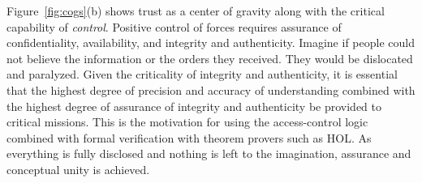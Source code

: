 Figure~\ref{fig:cogs}(b) shows trust as a center of gravity along with
the critical capability of \emph{control}. Positive control of forces
requires assurance of confidentiality, availability, and integrity and
authenticity. Imagine if people could not believe the information or
the orders they received. They would be dislocated and
paralyzed. Given the criticality of integrity and authenticity, it is
essential that the highest degree of precision and accuracy of
understanding combined with the highest degree of assurance of
integrity and authenticity be provided to critical missions.  This is
the motivation for using the access-control logic combined with formal
verification with theorem provers such as HOL.  As everything is fully
disclosed and nothing is left to the imagination, assurance and
conceptual unity is achieved.





